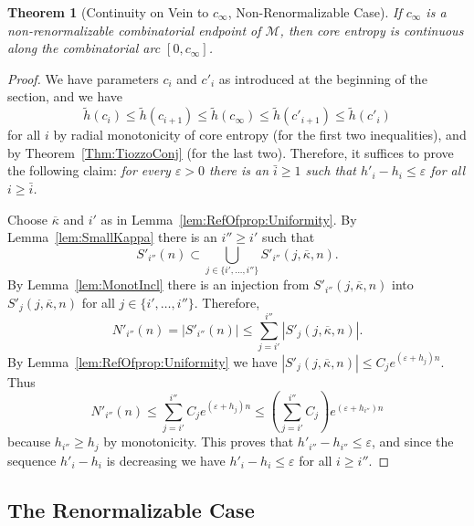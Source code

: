 \documentclass[12pt]{amsart}
\newcommand{\M}{\mathscr M}
\newcommand{\0}{\texttt{0}}
\newcommand{\1}{\texttt{1}}
\newcommand\eps{\varepsilon}
\newtheorem{theorem}{Theorem}[section]
\theoremstyle{definition}
\numberwithin{equation}{section}
\newcommand{\lineclear}{\rule{0pt}{2pt}\newline}
\begin{document}
\begin{theorem}[Continuity on Vein to $c_{\infty}$, Non-Renormalizable Case]
\label{thm:ContAtIrrNonRen}
If $c_\infty$ is a non-renormalizable combinatorial endpoint of $\M$, then core entropy is continuous along the combinatorial arc $[0,c_\infty]$.
\end{theorem}

\begin{proof}
We have parameters $c_i$ and $c'_i$ as introduced at the beginning of the section, and we have
\[
\tilde h(c_i) \le \tilde h(c_{i+1}) \le  \tilde h(c_\infty)\le \tilde h(c'_{i+1})\le  \tilde h(c'_i) 
\] 
for all $i$ by radial monotonicity of core entropy (for the first two inequalities), and by Theorem~\ref{Thm:TiozzoConj} (for the last two). 
Therefore, it suffices to prove the following claim:
\emph{
for every $\eps>0$ there is an $\bar i\ge 1$ such that $h'_{i}-h_{i}\le \eps$ for all $i\ge \bar i$.
}


Choose $\overline\kappa$ and $i'$ as in Lemma~\ref{lem:RefOfprop:Uniformity}.
By Lemma~\ref{lem:SmallKappa} there is an $i''\ge i'$ such that  
\[
S'_{i''}(n)\subset \bigcup_{j\in \{i',\dots ,i''\}} S'_{i''}(j,\overline \kappa,n).
\]
By Lemma~\ref{lem:MonotIncl} there is an injection from $S'_{i''}(j,\overline \kappa,n)$ into $S'_j(j,\overline \kappa,n)$ for all $j\in \{i',\dots ,i''\}$. Therefore,
\[
N'_{i''}(n)=|S'_{i''}(n)|\le  \sum_{j=i'}^{i''} |S'_j(j,\overline \kappa,n)|.
\]
By Lemma~\ref{lem:RefOfprop:Uniformity} we have $|S'_j(j,\overline \kappa,n)|\le C_j e^{(\eps+h_j) n}$. Thus
\[
N'_{i''}(n)\le  \sum_{j=i'}^{i''}C_j e^{(\eps+h_j) n} \le \left( \sum_{j=i'}^{i''}C_j\right) e^{(\eps +h_{i''})n} 
\]because $h_{i''}\ge h_{j}$ by monotonicity.
This proves that $h'_{i''}-h_{i''}\le \eps$, and since the sequence $h'_i-h_i$ is decreasing we have $h'_{i}-h_{i}\le \eps$ for all $i\ge i''$.
\end{proof}



\subsection{The Renormalizable Case}
\label{Sub:Renormalizable}
\end{document}
